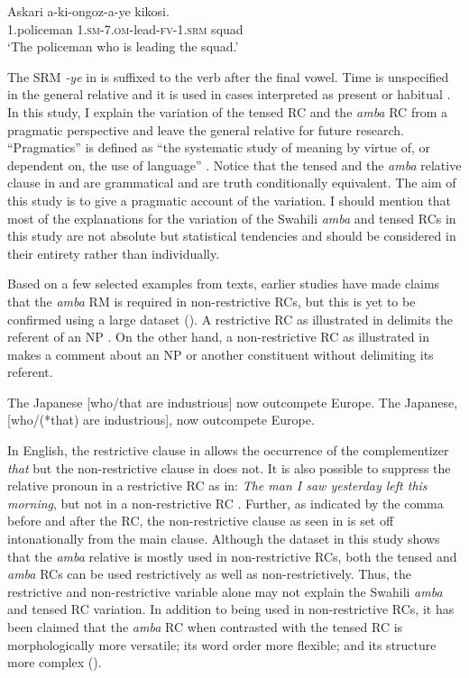 \documentclass[output=paper,colorlinks,citecolor=brown]{langscibook}
\begin{document}
\ea%
    \label{ex:mwamzandi:3}
    \gll    Askari a-ki-ongoz-a-ye kikosi.\\
            1.policeman  \textsc{1.sm-7.om-}lead\textsc{-fv-1.srm}  squad\\
    \glt    ‘The policeman who is leading the squad.’
\z

The SRM \textit{-ye} in  is suffixed to the verb after the final vowel. Time is unspecified in the general relative and it is used in cases interpreted as present or habitual \citep{Ashton1944}. In this study, I explain the variation of the tensed RC and the \textit{amba} RC from a pragmatic perspective and leave the general relative for future research. “Pragmatics” is defined as “the systematic study of meaning by virtue of, or dependent on, the use of language” \citep[2]{Huang2007}. Notice that the tensed and the \textit{amba} relative clause in  and  are grammatical and are truth conditionally equivalent. The aim of this study is to give a pragmatic account of the variation. I should mention that most of the explanations for the variation of the Swahili \textit{amba} and tensed RCs in this study are not absolute but statistical tendencies and should be considered in their entirety rather than individually.

Based on a few selected examples from texts, earlier studies have made claims that the \textit{amba} RM is required in non-restrictive RCs, but this is yet to be confirmed using a large dataset (\citealt{Ashton1944, Schadeberg1989}). A restrictive RC as illustrated in  delimits the referent of an NP \citep[206]{Andrews2007}. On the other hand, a non-restrictive RC as illustrated in  makes a comment about an NP or another constituent without delimiting its referent. 

\ea%
    \label{ex:mwamzandi:4}
    The Japanese [who/that are industrious] now outcompete Europe.
\ex%
    \label{ex:mwamzandi:5}
    The Japanese, [who/(*that) are industrious], now outcompete Europe. \hfill \citep[168]{Keenan1985}
\z

In English, the restrictive clause in  allows the occurrence of the complementizer \textit{that} but the non-restrictive clause in  does not. It is also possible to suppress the relative pronoun in a restrictive RC as in: \textit{The man I saw yesterday left this morning}, but not in a non-restrictive RC \citep[139]{Comrie1989}. Further, as indicated by the comma before and after the RC, the non-restrictive clause as seen in  is set off intonationally from the main clause. Although the dataset in this study shows that the \textit{amba} relative is mostly used in non-restrictive RCs, both the tensed and \textit{amba} RCs can be used restrictively as well as non-restrictively. Thus, the restrictive and non-restrictive variable alone may not explain the Swahili \textit{amba} and tensed RC variation. In addition to being used in non-restrictive RCs, it has been claimed that the \textit{amba} RC when contrasted with the tensed RC is morphologically more versatile; its word order more flexible; and its structure more complex (\citealt{Schadeberg1989, Russell1992}).
\end{document}
